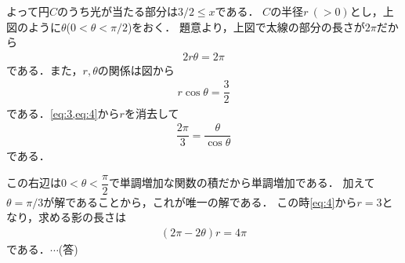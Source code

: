 \documentclass[../../main.tex]{subfiles}
\begin{document}
よって円$C$のうち光が当たる部分は$3/2\le x$である．
$C$の半径$r \ (>0)$とし，上図のように$\theta $($0<\theta<\pi/2$)をおく．
題意より，上図で太線の部分の長さが$2\pi$だから
\begin{align}
  2r\theta=2\pi \label{eq:3}
\end{align}
である．また，$r,\theta$の関係は図から
\begin{align}
  r\cos \theta=\dfrac{3}{2} \label{eq:4}
\end{align}
である．\cref{eq:3,eq:4}から$r$を消去して
\begin{align}
  \dfrac{2\pi}{3}=\dfrac{\theta}{\cos \theta}
\end{align}
である．

この右辺は$0<\theta<\dfrac{\pi}{2}$で単調増加な関数の積だから単調増加である．
加えて$\theta=\pi/3$が解であることから，これが唯一の解である．
この時\cref{eq:4}から$r=3$となり，求める影の長さは
\begin{align}
  (2\pi-2\theta)r=4\pi
\end{align}
である．$\cdots$(答)

\newpage
\end{document}
